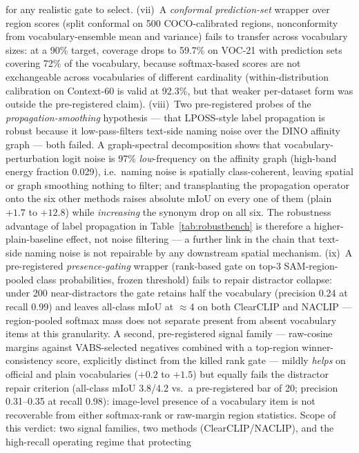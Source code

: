 \documentclass[11pt]{article}
\newcommand{\miou}{mIoU}
\begin{document}
for any realistic gate to select. (vii)~A \emph{conformal prediction-set} wrapper
over region scores (split conformal on 500 COCO-calibrated regions, nonconformity
from vocabulary-ensemble mean and variance) fails to transfer across vocabulary
sizes: at a 90\% target, coverage drops to 59.7\% on VOC-21 with prediction sets
covering 72\% of the vocabulary, because softmax-based scores are not exchangeable
across vocabularies of different cardinality (within-distribution calibration on
Context-60 is valid at 92.3\%, but that weaker per-dataset form was outside the
pre-registered claim).
(viii)~Two pre-registered probes of the \emph{propagation-smoothing} hypothesis ---
that LPOSS-style label propagation is robust because it low-pass-filters
text-side naming noise over the DINO affinity graph --- both failed. A
graph-spectral decomposition shows that vocabulary-perturbation logit noise is
97\% \emph{low}-frequency on the affinity graph (high-band energy fraction
0.029), i.e.\ naming noise is spatially class-coherent, leaving spatial or
graph smoothing nothing to filter; and transplanting the propagation operator
onto the six other methods raises absolute \miou{} on every one of them
(plain $+1.7$ to $+12.8$) while \emph{increasing} the synonym drop on all six.
The robustness advantage of label propagation in Table~\ref{tab:robustbench}
is therefore a higher-plain-baseline effect, not noise filtering --- a further
link in the chain that text-side naming noise is not repairable by any
downstream spatial mechanism.
(ix)~A pre-registered \emph{presence-gating} wrapper (rank-based gate on
top-$3$ SAM-region-pooled class probabilities, frozen threshold) fails to
repair distractor collapse: under 200 near-distractors the gate retains half
the vocabulary (precision 0.24 at recall 0.99) and leaves all-class \miou{} at
$\approx$4 on both ClearCLIP and NACLIP --- region-pooled softmax mass does not
separate present from absent vocabulary items at this granularity.
A second, pre-registered signal family --- raw-cosine margins against
VABS-selected negatives combined with a top-region winner-consistency score,
explicitly distinct from the killed rank gate --- mildly \emph{helps} on
official and plain vocabularies ($+0.2$ to $+1.5$) but equally fails the
distractor repair criterion (all-class \miou{} 3.8/4.2 vs.\ a pre-registered
bar of 20; precision 0.31--0.35 at recall 0.98): image-level presence of a
vocabulary item is not recoverable from either softmax-rank or raw-margin
region statistics. Scope of this verdict: two signal families, two methods
(ClearCLIP/NACLIP), and the high-recall operating regime that protecting
\end{document}

